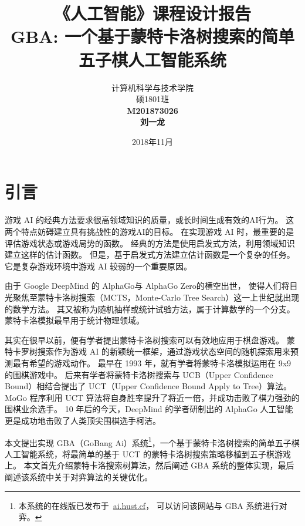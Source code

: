 \documentclass[UTF8,cs4size]{ctexart}
\title{《人工智能》课程设计报告\\ \bigskip \textbf{GBA: 一个基于蒙特卡洛树搜索的简单五子棋人工智能系统}}
\author{计算机科学与技术学院\\ 硕1801班\\ \textbf{M201873026}\\ \textbf{刘一龙}}
\date{2018年11月}
\begin{document}
\maketitle
\newpage
\null\thispagestyle{empty}
\newpage


\tableofcontents
\newpage
\null\thispagestyle{empty}
\newpage


\section{引言}
游戏 AI 的经典方法要求很高领域知识的质量，或长时间生成有效的AI行为。
这两个特点妨碍建立具有挑战性的游戏AI的目标。
在实现游戏 AI 时，最重要的是评估游戏状态或游戏局势的函数。
经典的方法是使用启发式方法，利用领域知识建立这样的估计函数。
但是，基于启发式方法建立估计函数是一个复杂的任务。
它是复杂游戏环境中游戏 AI 较弱的一个重要原因。

由于 Google DeepMind 的 AlphaGo\cite{DBLP:journals/nature/SilverHMGSDSAPL16}与 AlphaGo Zero\cite{silver2017mastering}的横空出世，
使得人们将目光聚焦至蒙特卡洛树搜索（MCTS，Monte-Carlo Tree Search）\cite{wiki:Monte_Carlo_tree_search}这一上世纪就出现的数学方法。
其又被称为随机抽样或统计试验方法，属于计算数学的一个分支。蒙特卡洛模拟\cite{binder1993monte}最早用于统计物理领域。

其实在很早以前，便有学者提出蒙特卡洛树搜索可以有效地应用于棋盘游戏\cite{DBLP:conf/aiide/ChaslotBSS08}。
蒙特卡罗树搜索作为游戏 AI 的新颖统一框架，通过游戏状态空间的随机探索用来预测最有希望的游戏动作。
最早在 1993 年\cite{brugmann1993monte}，就有学者将蒙特卡洛模拟运用在 9x9 的围棋游戏中。
后来有学者将蒙特卡洛树搜索与 UCB（Upper Confidence Bound）相结合提出了 UCT（Upper Confidence Bound Apply to Tree）算法\cite{DBLP:conf/ecml/KocsisS06}。
MoGo 程序\cite{DBLP:conf/cig/WangG07}\cite{DBLP:conf/icml/GellyS07}利用 UCT 算法将自身胜率提升了将近一倍，并成功击败了棋力强劲的围棋业余选手。
10 年后的今天，DeepMind 的学者研制出的 AlphaGo 人工智能更是成功地击败了人类顶尖围棋选手柯洁。

本文提出实现 GBA（GoBang Ai）系统\footnote{本系统的在线版已发布于~\href{http://ai.hust.cf}{ai.hust.cf}，
可以访问该网站与 GBA 系统进行对弈。}，一个基于蒙特卡洛树搜索的简单五子棋人工智能系统，将最简单的基于 UCT 的蒙特卡洛树搜索策略移植到五子棋游戏上。
本文首先介绍蒙特卡洛搜索树算法，然后阐述 GBA 系统的整体实现，最后阐述该系统中关于对弈算法的关键优化。
\newpage
\end{document}
